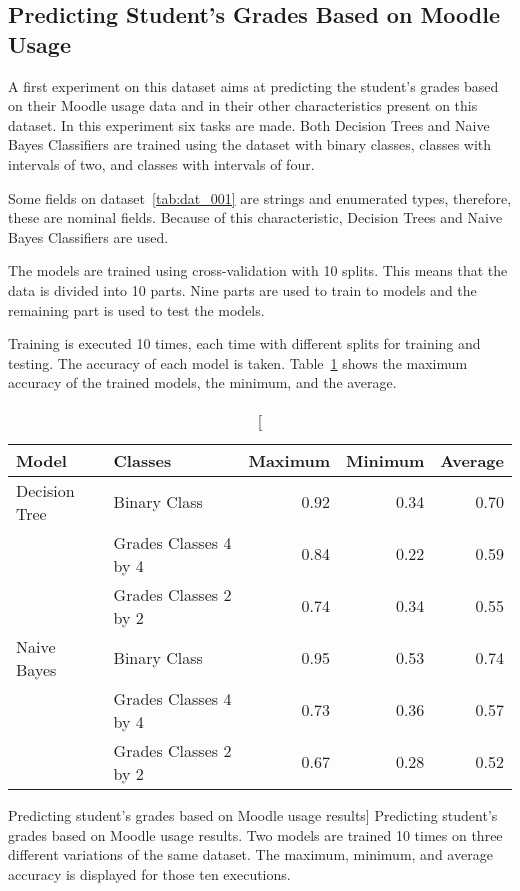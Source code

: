 \subsection{Predicting Student's Grades Based on Moodle Usage}
\label{sec:exp_001}

A first experiment on this dataset aims at predicting the student's grades based
on their Moodle usage data and in their other characteristics present on this
dataset. In this experiment six tasks are made. Both Decision Trees and Naive
Bayes Classifiers are trained using the dataset with binary classes, classes
with intervals of two, and classes with intervals of four.

Some fields on dataset~\ref{tab:dat_001} are strings and enumerated types,
therefore, these are nominal fields. Because of this characteristic, Decision
Trees and Naive Bayes Classifiers are used.

The models are trained using cross-validation with 10 splits. This means that
the data is divided into 10 parts. Nine parts are used to train to models and
the remaining part is used to test the models.

Training is executed 10 times, each time with different splits for training and
testing. The accuracy of each model is taken. Table~\ref{tab:exp_001_res} shows
the maximum accuracy of the trained models, the minimum, and the average.

\begin{table}[h!]
    \centering

    \begin{tabular}{| l | l | r | r | r |}
        \hline
        \textbf{Model} & \textbf{Classes} & \textbf{Maximum} & \textbf{Minimum} & \textbf{Average} \\ \hline
        Decision Tree & Binary Class          & 0.92 & 0.34 & 0.70 \\
                      & Grades Classes 4 by 4 & 0.84 & 0.22 & 0.59 \\
                      & Grades Classes 2 by 2 & 0.74 & 0.34 & 0.55 \\ \hline
        Naive Bayes   & Binary Class          & 0.95 & 0.53 & 0.74 \\
                      & Grades Classes 4 by 4 & 0.73 & 0.36 & 0.57 \\
                      & Grades Classes 2 by 2 & 0.67 & 0.28 & 0.52 \\ \hline
    \end{tabular}

    \caption
        [Predicting student's grades based on Moodle usage results]
        {Predicting student's grades based on Moodle usage results. Two models
        are trained 10 times on three different variations of the same dataset.
        The maximum, minimum, and average accuracy is displayed for those ten
        executions.}

    \label{tab:exp_001_res}
\end{table}


